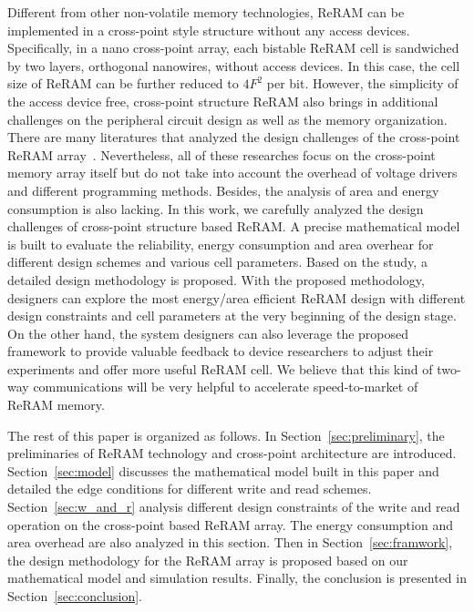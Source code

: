 Different from other non-volatile memory technologies, ReRAM can be implemented in a cross-point style structure without any access devices. Specifically, in a nano cross-point array, each bistable ReRAM cell is sandwiched by two layers, orthogonal nanowires, without access devices. In this case, the cell size of ReRAM can be further reduced to $4F^2$ per bit. However, the simplicity of the access device free, cross-point structure ReRAM also brings in additional challenges on the peripheral circuit design as well as the memory organization. There are many literatures that analyzed the design challenges of the cross-point ReRAM array~\cite{crossbar_NANO2002_Ziegler,crossbar_NANO08_Flocke,crossbar_TED_2010,crossbar_NANO2003_Ziegler}. Nevertheless, all of these researches focus on the cross-point memory array itself but do not take into account the overhead of voltage drivers and different programming methods. Besides, the analysis of area and energy consumption is also lacking. In this work, we carefully analyzed the design challenges of cross-point structure based ReRAM. A precise mathematical model is built to evaluate the reliability, energy consumption and area overhear for different design schemes and various cell parameters. Based on the study, a detailed design methodology is proposed. With the proposed methodology, designers can explore the most energy/area efficient ReRAM design with different design constraints and cell parameters at the very beginning of the design stage. On the other hand, the system designers can also leverage the proposed framework to provide valuable feedback to device researchers to adjust their experiments and offer more useful ReRAM cell. We believe that this kind of two-way communications will be very helpful to accelerate speed-to-market of ReRAM memory.

The rest of this paper is organized as follows. In
Section~\ref{sec:preliminary}, the preliminaries of ReRAM technology and cross-point architecture are introduced. Section~\ref{sec:model} discusses the mathematical model built in this paper and detailed the edge conditions for different write and read schemes. Section~\ref{sec:w_and_r} analysis different design constraints of the write and read operation on the cross-point based ReRAM array. The energy consumption and area overhead are also analyzed in this section. Then in Section~\ref{sec:framwork}, the design methodology for the ReRAM array is proposed based on our mathematical model and simulation results. Finally, the conclusion is presented in Section~\ref{sec:conclusion}. 